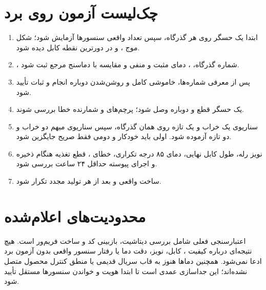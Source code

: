 \section{چک‌لیست آزمون روی برد}
\begin{enumerate}
  \item ابتدا یک حسگر روی هر گذرگاه، سپس تعداد واقعی سنسورها آزمایش شود؛ شکل موج ،  و  در دورترین نقطه کابل دیده شود.
  \item {}، شماره گذرگاه، ، دمای مثبت و منفی و مقایسه با دماسنج مرجع ثبت شود.
  \item پس از معرفی شماره‌ها، خاموشی کامل و روشن‌شدن دوباره انجام و ثبات  تأیید شود.
  \item یک حسگر قطع و دوباره وصل شود؛ پرچم‌های  و شمارنده خطا بررسی شوند.
  \item سناریوی یک خراب و یک تازه روی همان گذرگاه، سپس سناریوی مبهم دو خراب و دو تازه آزموده شود. اولی باید خودکار و دومی فقط صریح جایگزین شود.
  \item نویز رله، طول کابل نهایی، دمای ۸۵ درجه تکراری، خطای ، قطع تغذیه هنگام ذخیره و اجرای پیوسته حداقل ۲۴ ساعت بررسی شود.
  \item ساخت واقعی  و  بعد از هر تولید مجدد  تکرار شود.
\end{enumerate}

\section{محدودیت‌های اعلام‌شده}
اعتبارسنجی فعلی شامل بررسی دیتاشیت، بازبینی کد و ساخت فریم‌ور است. هیچ نتیجه‌ای درباره کیفیت ، کابل، نویز، دقت دما یا رفتار سنسور واقعی بدون آزمون برد ادعا نمی‌شود. همچنین دماها هنوز به قاب سریال قدیمی یا منطق کنترل محصول متصل نشده‌اند؛ این جداسازی عمدی است تا ابتدا هویت و خواندن سنسورها مستقل تأیید شود.
